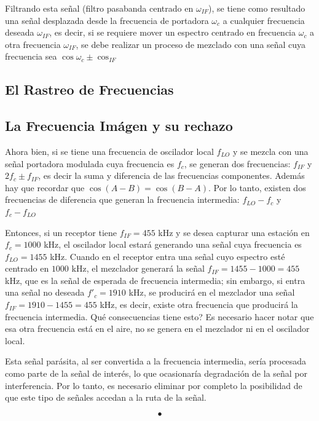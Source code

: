 \documentclass[12pt,letterpaper,titlepage,twoside]{book}
\begin{document}
 Filtrando esta señal (filtro pasabanda centrado en $\omega_{IF}$), se tiene como resultado una señal desplazada desde la frecuencia de portadora $\omega_c$ a cualquier frecuencia deseada $\omega_{IF}$, es decir, si se requiere mover un espectro centrado en frecuencia $\omega_c$ a otra frecuencia $\omega_{IF}$, se debe realizar un proceso de mezclado con una señal cuya frecuencia sea $\cos \omega_c \pm \cos_{IF} $
 
\subsection{El Rastreo de Frecuencias}
\subsection{La Frecuencia Imágen y su rechazo}

Ahora bien, si se tiene una frecuencia de oscilador local $f_{LO}$ y se mezcla con una señal portadora modulada cuya frecuencia es $f_c$, se generan dos frecuencias: $f_{IF}$ y $2f_c \pm f_{IF}$, es decir la suma y diferencia de las frecuencias componentes. Además hay que recordar que $\cos (A-B) = \cos (B-A)$. Por lo tanto, existen dos frecuencias de diferencia que generan la frecuencia intermedia: $f_{LO} - f_c$ y $f_c-f_{LO}$

Entonces, si un receptor tiene $f_{IF} = 455$  kHz y se desea capturar una estación en $f_c = 1000$ kHz, el oscilador local estará generando una señal cuya frecuencia es $f_{LO}= 1455$ kHz. Cuando en el receptor entra una señal cuyo espectro esté centrado en $1000$ kHz, el mezclador generará la señal $f_{IF} = 1455 - 1000 = 455$ kHz, que es la señal de esperada de frecuencia intermedia; sin embargo, si entra una señal no deseada $f'_c = 1910$ kHz, se producirá en el mezclador una señal $f_{IF} = 1910 - 1455 = 455$ kHz, es decir, existe otra frecuencia que producirá la frecuencia intermedia. Qué consecuencias tiene esto? Es necesario hacer notar que esa otra frecuencia está en el aire, no se genera en el mezclador ni en el oscilador local.

Esta señal parásita, al ser convertida a la frecuencia intermedia, sería procesada como parte de la señal de interés, lo que ocasionaría degradación de la señal por interferencia. Por lo tanto, es necesario eliminar por completo la posibilidad de que este tipo de señales accedan a la ruta de la señal. 


\begin{equation}
 •
 \end{equation} 
\end{document}
